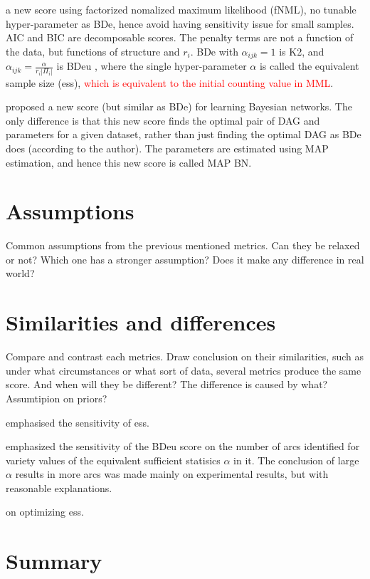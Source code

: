 \cite{silander2008factorized} a new score using factorized nomalized maximum likelihood (fNML), no tunable hyper-parameter as BDe, hence avoid having sensitivity issue for small samples. AIC and BIC are decomposable scores. The penalty terms are not a function of the data, but functions of structure and $r_i$. BDe with $\alpha_{ijk} = 1$ is K2, and $\alpha_{ijk} = \frac{\alpha}{r_i|\Pi_i|}$ is BDeu \cite{buntine1991theory}, where the single hyper-parameter $\alpha$ is called the equivalent sample size (ess), \textcolor{red}{which is equivalent to the initial counting value in MML}. 

\cite{riggelsen2008learning} proposed a new score (but similar as BDe) for learning Bayesian networks. The only difference is that this new score finds the optimal pair of DAG and parameters for a given dataset, rather than just finding the optimal DAG as BDe does (according to the author). The parameters are estimated using MAP estimation, and hence this new score is called MAP BN. 

\section{Assumptions}
Common assumptions from the previous mentioned metrics. Can they be relaxed or not? Which one has a stronger assumption? Does it make any difference in real world? 

\section{Similarities and differences}
Compare and contrast each metrics. Draw conclusion on their similarities, such as under what circumstances or what sort of data, several metrics produce the same score. And when will they be different? The difference is caused by what? Assumtipion on priors? 

\cite{steck2003dirichlet} emphasised the sensitivity of ess. 

\cite{silander2007sensitivity} emphasized the sensitivity of the BDeu score on the number of arcs identified for variety values of the equivalent sufficient statisics $\alpha$ in it. The conclusion of large $\alpha$ results in more arcs was made mainly on experimental results, but with reasonable explanations. 

\cite{steck2008learning} on optimizing ess. 

\section{Summary}




